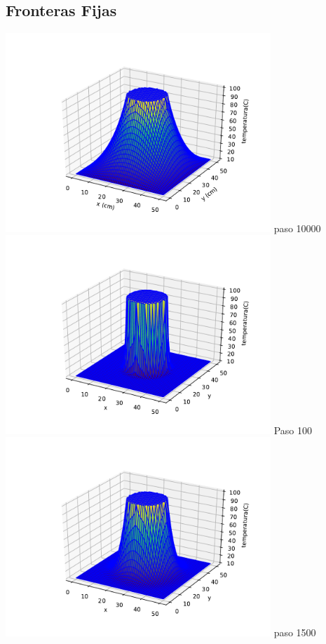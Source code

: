\documentclass[12pt]{article}
\begin{document}
\begin{centering}

\subsection{Fronteras Fijas}
\includegraphics[width=0.75\textwidth]{3d2.pdf}
paso 10000
\\
\includegraphics[width=0.75\textwidth]{3d3.pdf}
Paso 100
\\
\includegraphics[width=0.75\textwidth]{3d4.pdf}
paso 1500

\end{centering}
\end{document}
